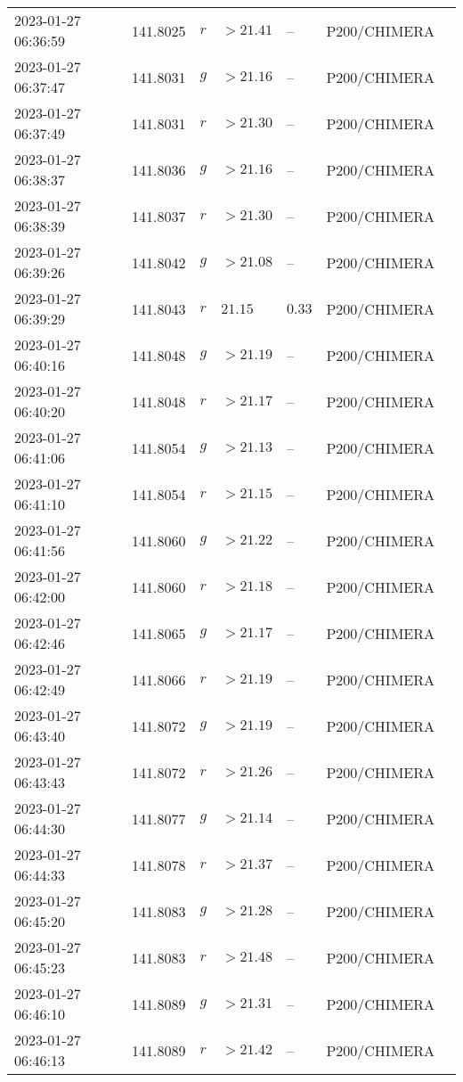 \documentclass{nature_plusfigure}
\begin{document}
\begin{supplement}
\begin{center}
\begin{longtable}{lllllll}
2023-01-27 06:36:59 & 141.8025 & $r$ & $>21.41$ & -- & P200/CHIMERA &  \\ 
2023-01-27 06:37:47 & 141.8031 & $g$ & $>21.16$ & -- & P200/CHIMERA &  \\ 
2023-01-27 06:37:49 & 141.8031 & $r$ & $>21.30$ & -- & P200/CHIMERA &  \\ 
2023-01-27 06:38:37 & 141.8036 & $g$ & $>21.16$ & -- & P200/CHIMERA &  \\ 
2023-01-27 06:38:39 & 141.8037 & $r$ & $>21.30$ & -- & P200/CHIMERA &  \\ 
2023-01-27 06:39:26 & 141.8042 & $g$ & $>21.08$ & -- & P200/CHIMERA &  \\ 
2023-01-27 06:39:29 & 141.8043 & $r$ & $21.15$ & $0.33$ & P200/CHIMERA &  \\ 
2023-01-27 06:40:16 & 141.8048 & $g$ & $>21.19$ & -- & P200/CHIMERA &  \\ 
2023-01-27 06:40:20 & 141.8048 & $r$ & $>21.17$ & -- & P200/CHIMERA &  \\ 
2023-01-27 06:41:06 & 141.8054 & $g$ & $>21.13$ & -- & P200/CHIMERA &  \\ 
2023-01-27 06:41:10 & 141.8054 & $r$ & $>21.15$ & -- & P200/CHIMERA &  \\ 
2023-01-27 06:41:56 & 141.8060 & $g$ & $>21.22$ & -- & P200/CHIMERA &  \\ 
2023-01-27 06:42:00 & 141.8060 & $r$ & $>21.18$ & -- & P200/CHIMERA &  \\ 
2023-01-27 06:42:46 & 141.8065 & $g$ & $>21.17$ & -- & P200/CHIMERA &  \\ 
2023-01-27 06:42:49 & 141.8066 & $r$ & $>21.19$ & -- & P200/CHIMERA &  \\ 
2023-01-27 06:43:40 & 141.8072 & $g$ & $>21.19$ & -- & P200/CHIMERA &  \\ 
2023-01-27 06:43:43 & 141.8072 & $r$ & $>21.26$ & -- & P200/CHIMERA &  \\ 
2023-01-27 06:44:30 & 141.8077 & $g$ & $>21.14$ & -- & P200/CHIMERA &  \\ 
2023-01-27 06:44:33 & 141.8078 & $r$ & $>21.37$ & -- & P200/CHIMERA &  \\ 
2023-01-27 06:45:20 & 141.8083 & $g$ & $>21.28$ & -- & P200/CHIMERA &  \\ 
2023-01-27 06:45:23 & 141.8083 & $r$ & $>21.48$ & -- & P200/CHIMERA &  \\ 
2023-01-27 06:46:10 & 141.8089 & $g$ & $>21.31$ & -- & P200/CHIMERA &  \\ 
2023-01-27 06:46:13 & 141.8089 & $r$ & $>21.42$ & -- & P200/CHIMERA &  \\ 

\end{longtable}
\end{center}
\end{supplement}
\end{document}
